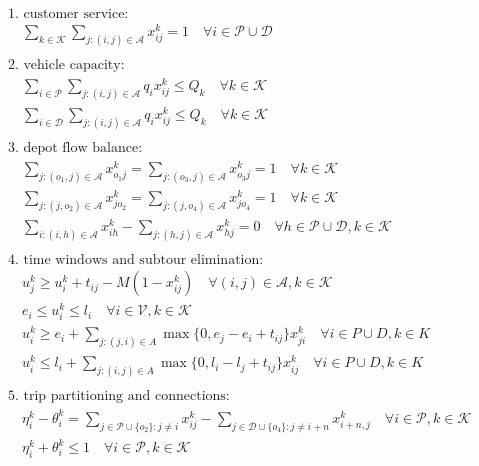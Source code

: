 \documentclass[10pt]{article}
\begin{document}
\begin{align*}
& \text{1. customer service:} \\
& \quad \sum_{k \in \mathcal{K}} \sum_{j: (i,j) \in \mathcal{A}} x_{ij}^k = 1 \quad \forall i \in \mathcal{P} \cup \mathcal{D} \\
\\
& \text{2. vehicle capacity:} \\
& \quad \sum_{i \in \mathcal{P}} \sum_{j: (i,j) \in \mathcal{A}} q_i x_{ij}^k \le Q_k \quad \forall k \in \mathcal{K} \\
& \quad \sum_{i \in \mathcal{D}} \sum_{j: (i,j) \in \mathcal{A}} q_i x_{ij}^k \le Q_k \quad \forall k \in \mathcal{K} \\
\\
& \text{3. depot flow balance:} \\
& \quad \sum_{j: (o_1, j) \in \mathcal{A}} x_{o_1 j}^k = \sum_{j: (o_3, j) \in \mathcal{A}} x_{o_3 j}^k = 1 \quad \forall k \in \mathcal{K} \\
& \quad \sum_{j: (j, o_2) \in \mathcal{A}} x_{j o_2}^k = \sum_{j: (j, o_4) \in \mathcal{A}} x_{j o_4}^k = 1 \quad \forall k \in \mathcal{K} \\
& \quad \sum_{i: (i, h) \in \mathcal{A}} x_{i h}^k - \sum_{j: (h, j) \in \mathcal{A}} x_{h j}^k = 0 \quad \forall h \in \mathcal{P} \cup \mathcal{D}, k \in \mathcal{K} \\
\\
& \text{4. time windows and subtour elimination:} \\
& \quad u_j^k \ge u_i^k + t_{ij} - M(1 - x_{ij}^k) \quad \forall (i, j) \in \mathcal{A}, k \in \mathcal{K} \\
& \quad e_i \le u_i^k \le l_i \quad \forall i \in \mathcal{V}, k \in \mathcal{K} \\
& \quad u_i^k \ge e_i + \sum_{j: (j,i) \in A} \max\{0, e_j - e_i + t_{ij}\} x_{ji}^k \quad \forall i \in P \cup D, k \in K \\
& \quad u_i^k \le l_i + \sum_{j: (i,j) \in A} \max\{0, l_i - l_j + t_{ij}\} x_{ij}^k \quad \forall i \in P \cup D, k \in K \\
\\
& \text{5. trip partitioning and connections:} \\
& \quad \eta_i^k - \theta_i^k = \sum_{j \in \mathcal{P} \cup \{o_2\}: j \neq i} x_{ij}^k - \sum_{j \in \mathcal{D} \cup \{o_4\}: j \neq i+n} x_{i+n, j}^k \quad \forall i \in \mathcal{P}, k \in \mathcal{K} \\
& \quad \eta_i^k + \theta_i^k \le 1 \quad \forall i \in \mathcal{P}, k \in \mathcal{K} \\

\end{align*}
\end{document}
